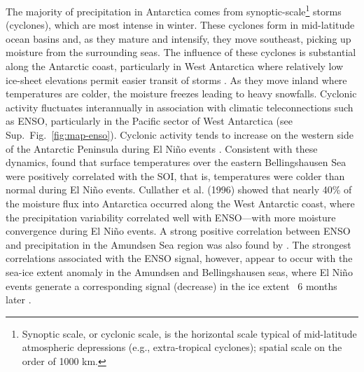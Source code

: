 The majority of precipitation in Antarctica comes from synoptic-scale\footnote{Synoptic scale, or cyclonic scale, is the horizontal scale typical of mid-latitude atmospheric depressions (e.g., extra-tropical cyclones); spatial scale on the order of 1000 km.} storms (cyclones), which are most intense in winter. These cyclones form in mid-latitude ocean basins and, as they mature and intensify, they move southeast, picking up moisture from the surrounding seas. The influence of these cyclones is substantial along the Antarctic coast, particularly in West Antarctica where relatively low ice-sheet elevations permit easier transit of storms \parencite{Riffenburgh2007}. As they move inland where temperatures are colder, the moisture freezes leading to heavy snowfalls. Cyclonic activity fluctuates interannually in association with climatic teleconnections such as ENSO, particularly in the Pacific sector of West Antarctica (see Sup.~Fig.~\ref{fig:map-enso}). Cyclonic activity tends to increase on the western side of the Antarctic Peninsula during El Ni\~no events \parencite{Riffenburgh2007}. Consistent with these dynamics, \textcite{Kwok2002} found that surface temperatures over the eastern Bellingshausen Sea were positively correlated with the SOI, that is, temperatures were colder than normal during El Ni\~no events. Cullather et al. (1996) showed that nearly 40\% of the moisture flux into Antarctica occurred along the West Antarctic coast, where the precipitation variability correlated well with ENSO---with more moisture convergence during El Ni\~no events. A strong positive correlation between ENSO and precipitation in the Amundsen Sea region was also found by \textcite{Genthon2003}. The strongest correlations associated with the ENSO signal, however, appear to occur with the sea-ice extent anomaly in the Amundsen and Bellingshausen seas, where El Ni\~no events generate a corresponding signal (decrease) in the ice extent ~6 months later \parencite{Yuan2000, Turner2004}.

